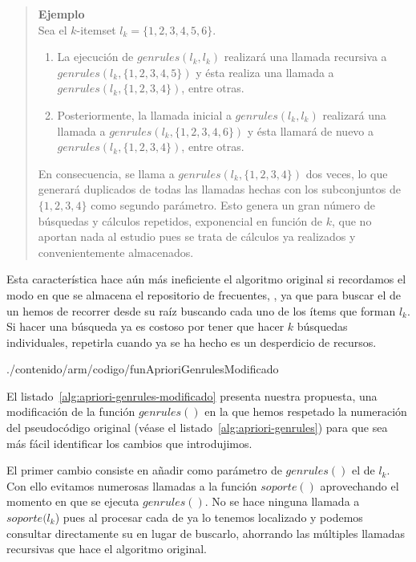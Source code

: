 \begin{quote}
\textbf{Ejemplo}\\
Sea el $k$-itemset $l_k = \{1, 2, 3, 4, 5, 6\}$.
\begin{enumerate}
    \item La ejecución de $genrules(l_k, l_k)$ realizará una llamada recursiva a $genrules(l_k, \{1, 2, 3, 4, 5\})$ y ésta realiza una llamada a $genrules(l_k, \{1, 2, 3, 4\})$, entre otras.
    \item Posteriormente, la llamada inicial a $genrules(l_k, l_k)$ realizará una llamada a $genrules(l_k, \{1, 2, 3, 4, 6\})$  y ésta llamará de nuevo a $genrules(l_k, \{1, 2, 3, 4\})$, entre otras.
\end{enumerate}
En consecuencia, se llama a $genrules(l_k, \{1, 2, 3, 4\})$ dos veces, lo que generará duplicados de todas las llamadas hechas con los subconjuntos de $\{1, 2, 3, 4\}$ como segundo parámetro. Esto genera un gran número de búsquedas y cálculos repetidos, exponencial en función de $k$, que no aportan nada al estudio pues se trata de cálculos ya realizados y convenientemente almacenados.
\end{quote}

Esta característica hace aún más ineficiente el algoritmo original si recordamos el modo en que se almacena el repositorio de \itemsets frecuentes, \aprioriL, ya que para buscar el \soporte de un \kitemset hemos de recorrer \aprioriL desde su raíz buscando cada uno de los ítems que forman $l_k$. Si hacer una búsqueda ya es costoso por tener que hacer $k$ búsquedas individuales, repetirla cuando ya se ha hecho es un desperdicio de recursos.


                 {./contenido/arm/codigo/funAprioriGenrulesModificado}

El listado~\ref{alg:apriori-genrules-modificado} presenta nuestra propuesta, una modificación de la función $genrules()$ en la que hemos respetado la numeración del pseudocódigo original (véase el listado~\ref{alg:apriori-genrules}) para que sea más fácil identificar los cambios que introdujimos.

El primer cambio consiste en añadir como parámetro de $genrules()$ el \soporte de $l_k$. Con ello evitamos numerosas llamadas a la función $soporte()$ aprovechando el momento en que se ejecuta $genrules()$. No se hace ninguna llamada a $soporte(l_k$) pues al procesar cada \kitemset de \aprioriL ya lo tenemos localizado y podemos consultar directamente su \soporte en lugar de buscarlo, ahorrando las múltiples llamadas recursivas que hace el algoritmo original.

